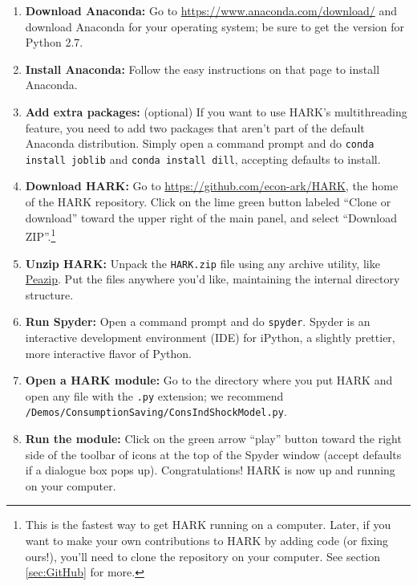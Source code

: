\documentclass[12pt,titlepage,letterpaper]{econtex}
\begin{document}
{\begin{enumerate}
\item \textbf{Download Anaconda:} Go to \href{https://www.anaconda.com/download/}{https://www.anaconda.com/download/} and download Anaconda for your operating system; be sure to get the version for Python 2.7.

\item \textbf{Install Anaconda:} Follow the easy instructions on that page to install Anaconda.

\item \textbf{Add extra packages:} (optional) If you want to use HARK's multithreading feature, you need to add two packages that aren't part of the default Anaconda distribution.  Simply open a command prompt and do \texttt{conda install joblib} and \texttt{conda install dill}, accepting defaults to install.

\item \textbf{Download HARK:} Go to \href{https://github.com/econ-ark/HARK}{https://github.com/econ-ark/HARK}, the home of the HARK repository.  Click on the lime green button labeled ``Clone or download'' toward the upper right of the main panel, and select ``Download ZIP''.\footnote{This is the fastest way to get HARK running on a computer.  Later, if you want to make your own contributions to HARK by adding code (or fixing ours!), you'll need to clone the repository on your computer.  See section \ref{sec:GitHub} for more.}

\item \textbf{Unzip HARK:} Unpack the \texttt{HARK.zip} file using any archive utility, like \href{http://www.peazip.org/}{Peazip}.  Put the files anywhere you'd like, maintaining the internal directory structure.

\item \textbf{Run Spyder:} Open a command prompt and do \texttt{spyder}.  Spyder is an interactive development environment (IDE) for iPython, a slightly prettier, more interactive flavor of Python.

\item \textbf{Open a HARK module:} Go to the directory where you put HARK and open any file with the \texttt{.py} extension; we recommend \texttt{/Demos/ConsumptionSaving/ConsIndShockModel.py}.

\item \textbf{Run the module:} Click on the green arrow ``play'' button toward the right side of the toolbar of icons at the top of the Spyder window (accept defaults if a dialogue box pops up).  Congratulations! HARK is now up and running on your computer.
\end{enumerate}

}
\end{document}
